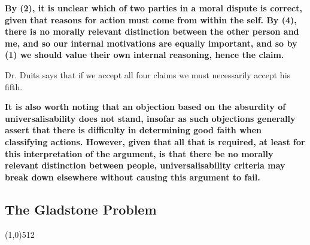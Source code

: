 \documentclass[11pt,a4paper]{report}
\let\origsection\subsection
\renewcommand{\subsection}[1]{\origsection{#1}\vspace{-0.5em}\line(1,0){512}\vspace{-1em}}
\begin{document}
\begin{multicols}{2}
		\textbf{By (2), it is unclear which of two parties in a moral dispute is correct, given that reasons for action must come from within the self. By (4), there is no morally relevant distinction between the other person and me, and so our internal motivations are equally important, and so by (1) we should value their own internal reasoning, hence the claim.}
		
		Dr. Duits says that if we accept all four claims we must necessarily accept his fifth.
		
		\textbf{It is also worth noting that an objection based on the absurdity of universalisability does not stand, insofar as such objections generally assert that there is difficulty in determining good faith when classifying actions. However, given that all that is required, at least for this interpretation of the argument, is that there be no morally relevant distinction between people, universalisability criteria may break down elsewhere without causing this argument to fail.}
		
	\end{multicols}
	
	\subsection{The Gladstone Problem}
	
\end{document}
